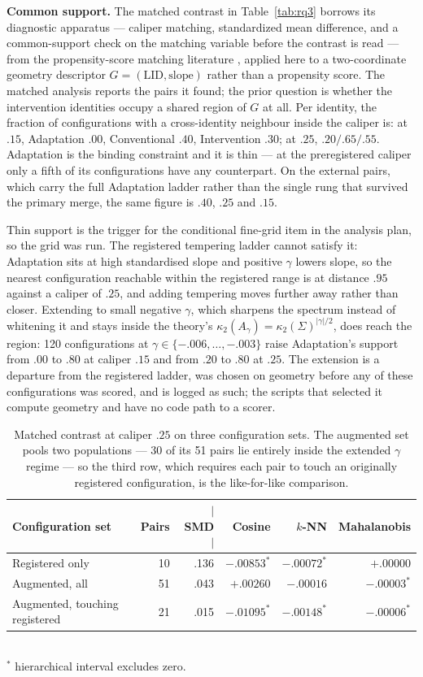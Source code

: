 \documentclass[11pt,a4paper]{article}
\begin{document}
\textbf{Common support.} The matched contrast in Table~\ref{tab:rq3} borrows its
diagnostic apparatus --- caliper matching, standardized mean difference, and a
common-support check on the matching variable before the contrast is read ---
from the propensity-score matching literature \cite{b22}, applied here to a
two-coordinate geometry descriptor $G=(\mathrm{LID},\mathrm{slope})$ rather than
a propensity score. The matched analysis reports the pairs it found; the
prior question is whether the intervention identities occupy a shared region of
$G$ at all. Per identity, the fraction of configurations with a cross-identity
neighbour inside the caliper is: at $.15$, Adaptation $.00$, Conventional $.40$,
Intervention $.30$; at $.25$, $.20/.65/.55$. Adaptation is the binding
constraint and it is thin --- at the preregistered caliper only a fifth of its
configurations have any counterpart. On the external pairs, which carry the full
Adaptation ladder rather than the single rung that survived the primary merge,
the same figure is $.40$, $.25$ and $.15$.

Thin support is the trigger for the conditional fine-grid item in the analysis
plan, so the grid was run. The registered tempering ladder cannot satisfy it:
Adaptation sits at high standardised slope and positive $\gamma$ lowers slope,
so the nearest configuration reachable within the registered range is at
distance $.95$ against a caliper of $.25$, and adding tempering moves further
away rather than closer. Extending to small negative $\gamma$, which sharpens
the spectrum instead of whitening it and stays inside the theory's
$\kappa_2(A_\gamma)=\kappa_2(\Sigma)^{|\gamma|/2}$, does reach the region: 120
configurations at $\gamma\in\{-.006,\dots,-.003\}$ raise Adaptation's support
from $.00$ to $.80$ at caliper $.15$ and from $.20$ to $.80$ at $.25$. The
extension is a departure from the registered ladder, was chosen on geometry
before any of these configurations was scored, and is logged as such; the
scripts that selected it compute geometry and have no code path to a scorer.

\begin{table}[t]
\centering
\caption{Matched contrast at caliper $.25$ on three configuration sets. The augmented set pools two populations --- 30 of its 51 pairs lie entirely inside the extended $\gamma$ regime --- so the third row, which requires each pair to touch an originally registered configuration, is the like-for-like comparison.}
\label{tab:support}
\small
\begin{tabular}{lrrrrr}
\toprule
Configuration set & Pairs & $|$SMD$|$ & Cosine & $k$-NN & Mahalanobis\\
\midrule
Registered only & 10 & .136 & $-.00853^\ast$ & $-.00072^\ast$ & $+.00000$\\
Augmented, all & 51 & .043 & $+.00260$ & $-.00016$ & $-.00003^\ast$\\
Augmented, touching registered & 21 & .015 & $-.01095^\ast$ & $-.00148^\ast$ & $-.00006^\ast$\\
\bottomrule
\end{tabular}
\\[2pt]
\footnotesize $^\ast$ hierarchical interval excludes zero.
\end{table}
\end{document}
